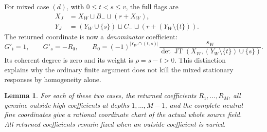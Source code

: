 \documentclass[11pt,a4paper]{amsart}
\numberwithin{equation}{section}
\theoremstyle{plain}
\newtheorem{lemma}[theorem]{Lemma}
\theoremstyle{definition}
\newcommand{\JT}{\operatorname{JT}}
\begin{document}
For mixed case \((d)\), with \(0\le t<s\le v\), the full flags are
\begin{equation}\label{ph:mixed-flags}
 \begin{aligned}
 X_J&=X_W\sqcup B_-\sqcup(r+X_W),\\
 Y_J&=(Y_W\cup\{s\})\sqcup C_-\sqcup(r+(Y_W\setminus\{t\})).
 \end{aligned}
\end{equation}
The returned coordinate is now a \emph{denominator} coefficient:
\[
 G'_t=1,\qquad G'_s=-R_0,\qquad
 R_0=(-1)^{|Y_W\cap(t,s)|}\frac{s_W}{\det\JT(X_W,(Y_W\setminus\{t\})\cup\{s\})}.
\]
Its coherent degree is zero and its weight is \(\rho=s-t>0\).
This distinction explains why the ordinary finite argument does not kill
the mixed stationary responses by homogeneity alone.

\begin{lemma}\label{ph:source-chart}
For each of these two cases, the returned coefficients
\(R_1,\ldots,R_M\), all genuine outside high coefficients at depths
\(1,\ldots,M-1\), and the complete neutral fine coordinates give a rational
coordinate chart of the actual whole source field.  All returned
coefficients remain fixed when an outside coefficient is varied.
\end{lemma}
\end{document}
